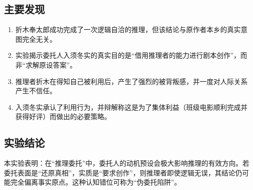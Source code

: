 \documentclass[a3paper, twocolumn]{article}
\begin{document}
\subsection{主要发现}
\begin{enumerate}
    \item 折木奉太郎成功完成了一次逻辑自洽的推理，但该结论与原作者本乡的真实意图完全无关。
    \item 实验揭示委托人入须冬实的真实目的是“借用推理者的能力进行剧本创作”，而非“求解原设答案”。
    \item 推理者折木在得知自己被利用后，产生了强烈的被背叛感，并一度对人际关系产生不信任。
    \item 入须冬实承认了利用行为，并辩解称这是为了集体利益（班级电影顺利完成并获得好评）而做出的必要策略。
\end{enumerate}

\subsection{实验结论}
本实验表明：在“推理委托”中，委托人的动机预设会极大影响推理的有效方向。若委托表面是“还原真相”，实质是“要求创作”，则推理者即使逻辑无误，其结论仍可能完全偏离事实原点。这种认知错位可称为“伪委托陷阱”。
\end{document}
